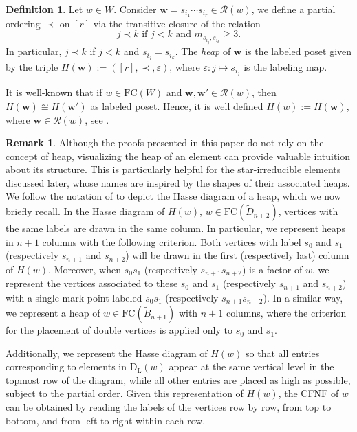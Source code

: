 \documentclass{amsart}
\newcommand{\D}{{\widetilde{D}_{n+2}}}
\newcommand{\B}{{\widetilde{B}_{n+1}}}
\newcommand{\ld}{{\mathrm{D}_{\mathrm{L}}}}
\newcommand{\fc}{{\mathrm{FC}}}
\theoremstyle{definition}
\newtheorem{Definition}[Theorem]{Definition}
\newtheorem{Remark}[Theorem]{Remark}
\begin{document}
\begin{Definition}
\label{heap}
Let $w\in W$. Consider $\mathbf{w}=s_{i_1}\cdots s_{i_r}\in \mathcal{R}(w)$, we define a partial ordering $\prec$ on $[r]$ via the transitive closure of the relation \[j\prec k \mbox{ if }j<k \mbox{ and } m_{s_{i_j},s_{i_k}}\ge 3.\]
In particular, $j\prec k$ if $j<k$ and $s_{i_j}=s_{i_k}$. The \textit{heap} of $\mathbf w$ is the labeled poset given by the triple $H({\mathbf w}):=([r], \prec, \varepsilon)$, where $ \varepsilon:j\mapsto s_{i_j}$ is the labeling map.
\end{Definition}

It is well-known that if $w\in \fc(W)$ and $\mathbf{w},\mathbf{w'}\in \mathcal{R}(w)$, then $H(\mathbf{w})\cong H(\mathbf{w'})$ as labeled poset. Hence, it is well defined $H(w):=H(\mathbf{w})$, where $\mathbf{w}\in \mathcal{R}(w)$, see \cite{viennot}.

\begin{Remark}\label{not:label}
Although the proofs presented in this paper do not rely on the concept of heap, visualizing the heap of an element can provide valuable intuition about its structure. This is particularly helpful for the star-irreducible elements discussed later, whose names are inspired by the shapes of their associated heaps. We follow the notation of \cite{BFS} to depict the Hasse diagram of a heap, which we now briefly recall. In the Hasse diagram of $H(w)$, $w\in \fc(\D)$, vertices with the same labels are drawn in the same column. In particular, we represent heaps in $n+1$ columns with the following criterion. Both vertices with label $s_0$ and $s_1$ (respectively $s_{n+1}$ and $s_{n+2}$) will be drawn in the first (respectively last) column of $H(w)$. Moreover, when $s_0s_1$ (respectively $s_{n+1}s_{n+2}$) is a factor of $w$, we represent the vertices associated to these $s_0$ and $s_1$ (respectively $s_{n+1}$ and $s_{n+2}$) with a single mark point labeled $s_0s_1$ (respectively $s_{n+1}s_{n+2}$). In a similar way, we represent a heap of $w\in \fc(\B)$ with $n+1$ columns, where the criterion for the placement of double vertices is applied only to $s_0$ and $s_1$. 

Additionally, we represent the Hasse diagram of  $H(w)$ so that all entries corresponding to elements in
$\ld(w)$ appear at the same vertical level in the topmost row of the diagram, while all other entries are placed as high as possible, subject to the partial order. Given this representation of $H(w)$, the CFNF of $w$ can be obtained by reading the labels of the vertices row by row, from top to bottom, and from left to right within each row. 
\end{Remark}
\end{document}
